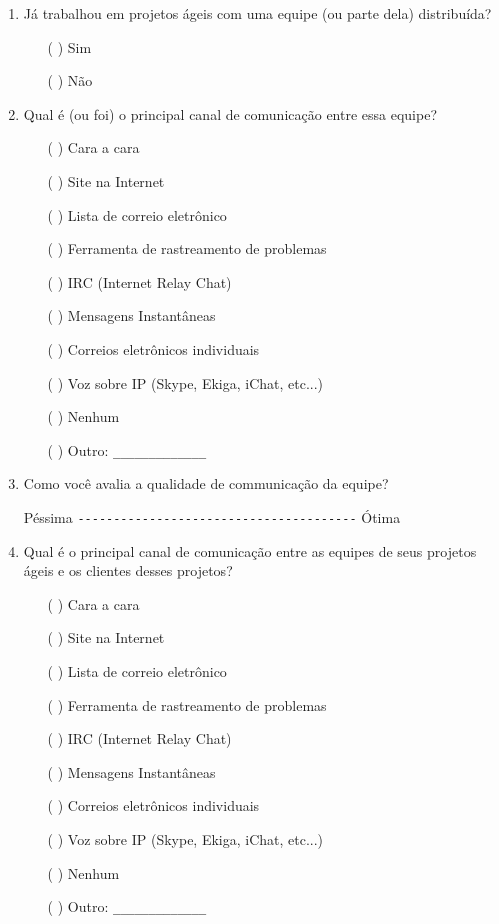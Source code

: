 \begin{enumerate}
\item Já trabalhou em projetos ágeis com uma equipe (ou parte dela)
  distribuída?
  \begin{itemize}
  \item[( )] Sim
  \item[( )] Não
  \end{itemize}

\item Qual é (ou foi) o principal canal de comunicação entre essa
  equipe?
  \begin{itemize}
  \item[( )] Cara a cara
  \item[( )] Site na Internet
  \item[( )] Lista de correio eletrônico
  \item[( )] Ferramenta de rastreamento de problemas
  \item[( )] IRC (Internet Relay Chat)
  \item[( )] Mensagens Instantâneas
  \item[( )] Correios eletrônicos individuais
  \item[( )] Voz sobre IP (Skype, Ekiga, iChat, etc...)
  \item[( )] Nenhum
  \item[( )] Outro: \verb=_____________=
  \end{itemize}

\item Como você avalia a qualidade de communicação da equipe?

  Péssima \verb=---------------------------------------= Ótima

\item Qual é o principal canal de comunicação entre as equipes de seus
  projetos ágeis e os clientes desses projetos?
  \begin{itemize}
  \item[( )] Cara a cara
  \item[( )] Site na Internet
  \item[( )] Lista de correio eletrônico
  \item[( )] Ferramenta de rastreamento de problemas
  \item[( )] IRC (Internet Relay Chat)
  \item[( )] Mensagens Instantâneas
  \item[( )] Correios eletrônicos individuais
  \item[( )] Voz sobre IP (Skype, Ekiga, iChat, etc...)
  \item[( )] Nenhum
  \item[( )] Outro: \verb=_____________=
  \end{itemize}


\end{enumerate}
